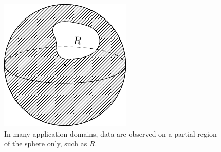\begin{figure}[htp]
	\centering
	\includegraphics{create_example_region_sphere.pdf}
	\caption{
		In many application domains, data are observed on a partial region of the sphere only, such as \(R\).
	}\label{fig:chapter3_region}
\end{figure}
